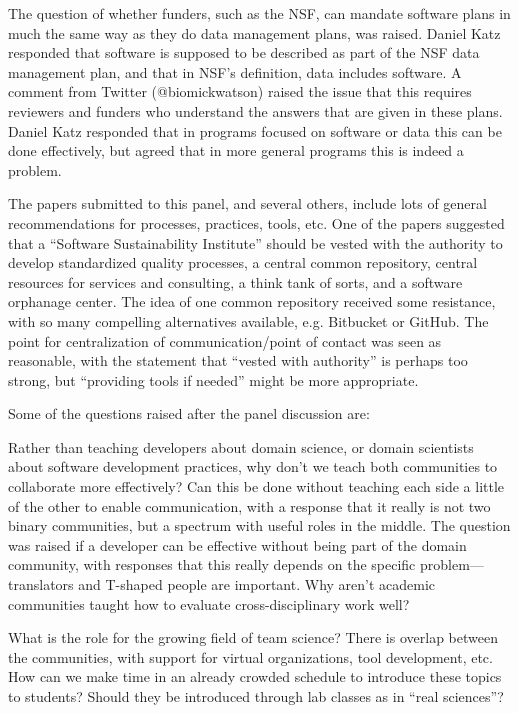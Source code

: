\documentclass[11pt, oneside]{amsart}
\begin{document}
The question of whether funders, such as the NSF, can mandate software plans in
much the same way as they do data management plans, was raised. Daniel Katz responded that
software is supposed to be described as part of the NSF data management plan,
and that in NSF's definition, data includes software. A comment from Twitter
(@biomickwatson) raised the issue that this requires reviewers and funders who
understand the answers that are given in these plans. Daniel Katz responded
that in programs focused on software or data this can be done effectively, but
agreed that in more general programs this is indeed a problem.

The papers submitted to this panel, and several others, include lots of general
recommendations for processes, practices, tools, etc. One of the papers
suggested that a ``Software Sustainability Institute'' should be vested with
the authority to develop standardized quality processes, a central common
repository, central resources for services and consulting, a think tank of
sorts, and a software orphanage center. The idea of one common repository received
some resistance, with so many compelling alternatives available, e.g. Bitbucket or
GitHub. The point for centralization of communication/point of contact was seen as
reasonable, with the statement that ``vested with authority'' is perhaps too strong,
but ``providing tools if needed'' might be more appropriate.

Some of the questions raised after the panel discussion are:

Rather than teaching developers about domain science, or domain scientists about
software development practices, why don't we teach both communities to
collaborate more effectively? Can this be done without teaching each side a
little of the other to enable communication, with a response that it really is
not two binary communities, but a spectrum with useful roles in the middle.
The question was raised if a developer can be effective without being part of the
domain community, with responses that this really depends on the specific
problem---translators and T-shaped people are important. Why aren't academic
communities taught how to evaluate cross-disciplinary work well?

What is the role for the growing field of team science? There
is overlap between the communities, with support for virtual organizations,
tool development, etc. How can we make time in an already crowded schedule to
introduce these topics to students? Should they be introduced through lab
classes as in ``real sciences''?
\end{document}
